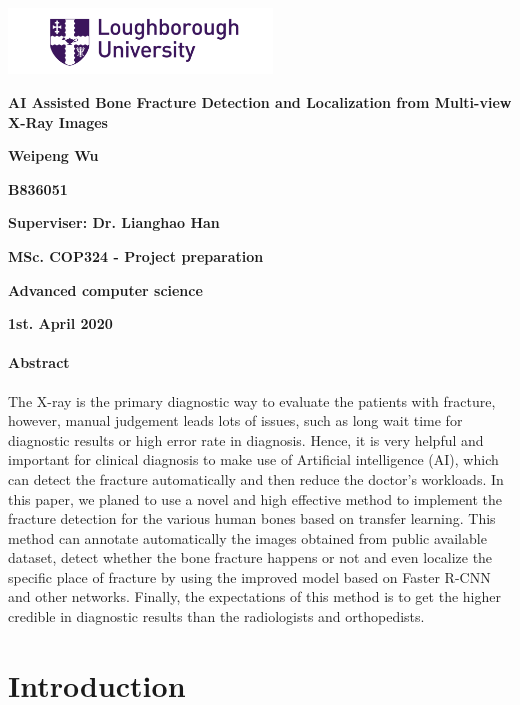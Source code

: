 \documentclass[12pt,oneside,a4paper]{article}
\newcommand*{\maketitledavid}{
    \thispagestyle{empty}
    \begin{center}
    	\vspace*{2cm}
    	\includegraphics[width = 7cm]{images/LoughboroughLogo.png} \par
    	\vspace{2cm}
    	\textbf{\LARGE{\fontsize{12pt}{50pt}AI Assisted Bone Fracture Detection and Localization from Multi-view X-Ray Images}} \par
    	\vspace{1cm}
    	\textbf{\normalsize{Weipeng Wu}} \par
	\textbf{\normalsize{B836051}} \par
	\textbf{\normalsize{Superviser: Dr. Lianghao Han}} \par

    	\vfill 
	\textbf{\small {MSc. COP324 - Project preparation}} \par
    	\textbf{\small {Advanced computer science}}\par
	\textbf{\small{1st. April 2020}} \par
    	\vspace{1cm}
    \end{center}
    \setcounter{page}{0}
}
\begin{document}
\maketitledavid %
\clearpage
\paragraph{Abstract} 
The X-ray is the primary diagnostic way to evaluate the patients with fracture, however, manual judgement leads lots of issues, such as long wait time for diagnostic results or high error rate in diagnosis. Hence, it is very helpful and important for clinical diagnosis to make use of Artificial intelligence (AI), which can detect the fracture automatically and then reduce the doctor’s workloads. In this paper, we planed to use a novel and high effective method to implement the fracture detection for the various human bones based on transfer learning. This method can annotate automatically the images obtained from public available dataset, detect whether the bone fracture happens or not and even localize the specific place of fracture by using the improved model based on Faster R-CNN and other networks. Finally, the expectations of this method is to get the higher credible in diagnostic results than the radiologists and orthopedists.
\thispagestyle{empty}
\clearpage
\tableofcontents
\thispagestyle{empty}
\setcounter{page}{0}


\clearpage
\section{Introduction}
\end{document}
